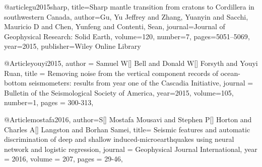 @article{gu2015sharp,
  title={Sharp mantle transition from cratons to Cordillera in southwestern Canada},
  author={Gu, Yu Jeffrey and Zhang, Yuanyin and Sacchi, Mauricio D and Chen, Yunfeng and Contenti, Sean},
  journal={Journal of Geophysical Research: Solid Earth},
  volume={120},
  number={7},
  pages={5051--5069},
  year={2015},
  publisher={Wiley Online Library}
}



@Article{youyi2015,
  author =	 {Samuel W[] Bell and Donald W[] Forsyth and Youyi Ruan},
  title =	 {Removing noise from the vertical component records of ocean-bottom seismometers: results from year one of the Cascadia Initiative},
  journal =	 {Bulletin of the Seismological Society of America},
  year=2015,
  volume=105,
  number=1,
  pages =	 {300-313},
}


@Article{mostafa2016,
  author={S[] Mostafa Mousavi and Stephen P[] Horton and Charles A[] Langston and Borhan Samei},
  title={ Seismic features and automatic discrimination of deep and shallow induced-microearthquakes using neural network and logistic regression},
  journal = 	 {Geophysical Journal International},
  year = 	 2016,
  volume =	 207,
  pages =	 {29-46},
}





